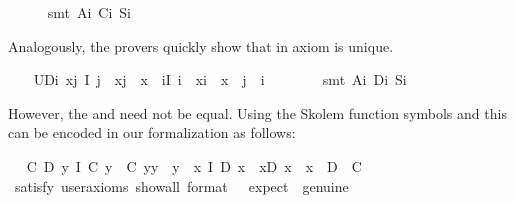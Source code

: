 \begin{isabellebody}
%
\isadelimproof
\ \ \ \ %
\endisadelimproof
%
\isatagproof
{}\isamarkupfalse%
\ {\isacharparenleft}smt\ A\isactrlsub i\ C\isactrlsub i\ S\isactrlsub i{\isacharparenright}%
\endisatagproof
{\isafoldproof}%
%
\isadelimproof
%
\endisadelimproof
%
\begin{isamarkuptext}%
Analogously, the provers quickly show that  in axiom  is unique.%
\end{isamarkuptext}\isamarkuptrue%
\ \ \isamarkupfalse%
\ UD\isactrlsub i{\isacharcolon}\ {\isachardoublequoteopen}\isactrlbold {\isasymforall}x{\isachardot}\isactrlbold {\isasymexists}j{\isachardot}\ I\ j\ \isactrlbold {\isasymand}\ x{\isasymcdot}j\ {\isasymcong}\ x\ \isactrlbold {\isasymand}\ {\isacharparenleft}\isactrlbold {\isasymforall}i{\isachardot}{\isacharparenleft}I\ i\ \isactrlbold {\isasymand}\ x{\isasymcdot}i\ {\isasymcong}\ x{\isacharparenright}\ \isactrlbold {\isasymrightarrow}\ j\ {\isasymcong}\ i{\isacharparenright}{\isachardoublequoteclose}\ \ \isanewline
%
\isadelimproof
\ \ \ \ %
\endisadelimproof
%
\isatagproof
{}\isamarkupfalse%
\ {\isacharparenleft}smt\ A\isactrlsub i\ D\isactrlsub i\ S\isactrlsub i{\isacharparenright}%
\endisatagproof
{\isafoldproof}%
%
\isadelimproof
%
\endisadelimproof
%
\begin{isamarkuptext}%
However, the  and  need not be equal. Using the Skolem 
   function symbols  and  this can be encoded in
   our formalization as follows:%
\end{isamarkuptext}\isamarkuptrue%
\ \isamarkupfalse%
\ {\isachardoublequoteopen}{\isacharparenleft}{\isasymexists}C\ D{\isachardot}\ {\isacharparenleft}\isactrlbold {\isasymforall}y{\isachardot}\ I\ {\isacharparenleft}C\ y{\isacharparenright}\ \isactrlbold {\isasymand}\ {\isacharparenleft}C\ y{\isacharparenright}{\isasymcdot}y\ {\isasymcong}\ y{\isacharparenright}\ \isactrlbold {\isasymand}\ {\isacharparenleft}\isactrlbold {\isasymforall}x{\isachardot}\ I\ {\isacharparenleft}D\ x{\isacharparenright}\ \isactrlbold {\isasymand}\ x{\isasymcdot}{\isacharparenleft}D\ x{\isacharparenright}\ {\isasymcong}\ x{\isacharparenright}\ \isactrlbold {\isasymand}\ \isactrlbold {\isasymnot}{\isacharparenleft}D\ {\isacharequal}\ C{\isacharparenright}{\isacharparenright}{\isachardoublequoteclose}\isanewline
\ \ \ \isamarkupfalse%
\ {\isacharbrackleft}satisfy{\isacharcomma}\ user{\isacharunderscore}axioms{\isacharcomma}\ show{\isacharunderscore}all{\isacharcomma}\ format\ {\isacharequal}\ {}{\isacharcomma}\ expect\ {\isacharequal}\ genuine{\isacharbrackright}%

\end{isabellebody}
